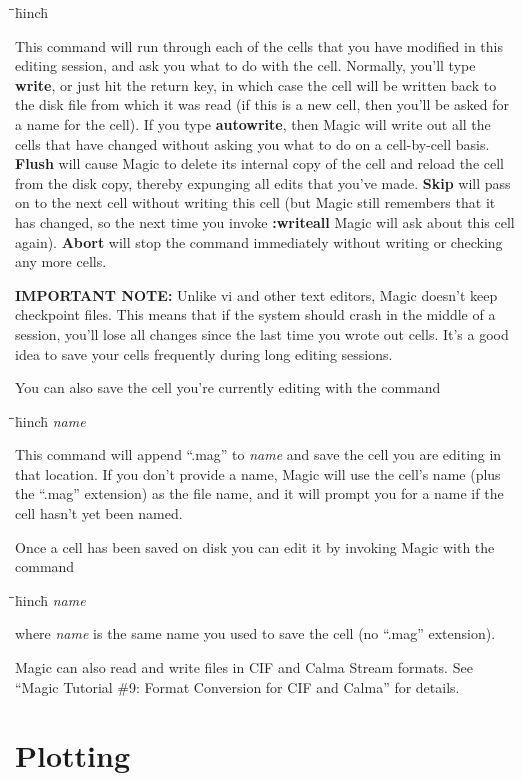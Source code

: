 \documentclass[letterpaper,twoside,12pt]{article}
\def\hinch{\hspace*{0.5in}}
\def\starti{\begin{center}\begin{tabbing}\hinch\=\hinch\=\hinch\=hinch\=\kill}
\def\endi{\end{tabbing}\end{center}}
\def\ii{\>\>\>}
\begin{document}
\starti
   \ii {\bfseries :writeall}
\endi

This command will run through each of the cells that you have
modified in this editing session, and ask you what to do with
the cell.  Normally, you'll type {\bfseries write}, or just hit the
return key, in which case the cell will be written back
to the disk file from which it was read (if this is a new cell,
then you'll be asked for a name for the cell).  If you type
{\bfseries autowrite}, then Magic will write out all the cells that have
changed without asking you what to do on a cell-by-cell basis.
{\bfseries Flush} will cause Magic to delete its internal copy of the cell
and reload the cell from the disk copy, thereby expunging all edits
that you've made.  {\bfseries Skip} will pass on to the next cell without
writing this cell (but Magic still remembers that it has
changed, so the next time you invoke {\bfseries :writeall} Magic
will ask about this cell again).  {\bfseries Abort} will stop
the command immediately without writing or checking any more cells.

{\bfseries IMPORTANT NOTE:}  Unlike vi and other text editors, Magic
doesn't keep checkpoint files.  This means that if the system
should crash in the middle of a session, you'll lose all changes
since the last time you wrote out cells.  It's a good idea to
save your cells frequently during long editing sessions.

You can also save the cell you're currently editing with the command

\starti
  \ii {\bfseries :save} {\itshape name}
\endi

This command will append ``.mag'' to {\itshape name} and save the cell you
are editing in that location.  If you don't provide a
name, Magic will use the cell's name (plus the ``.mag''
extension) as the file name, and it will prompt you for
a name if the cell hasn't yet been named.

Once a cell has been saved on disk you can edit it by
invoking Magic with the command

\starti
   \ii {\bfseries magic} {\itshape name}
\endi

where {\itshape name} is the same name you used to save the
cell (no ``.mag'' extension).

Magic can also read and write files in CIF and Calma Stream formats.
See ``Magic Tutorial  \#9: Format Conversion for CIF and Calma''
for details.

\section{Plotting}
\end{document}
